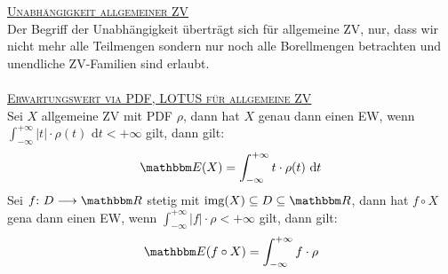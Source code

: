 \textsc{\underline{Unabhängigkeit allgemeiner ZV}}\\
    Der Begriff der Unabhängigkeit überträgt sich für allgemeine ZV, nur, dass wir nicht mehr alle Teilmengen sondern nur noch alle Borellmengen betrachten und unendliche ZV-Familien sind erlaubt. \\ \\
\textsc{\underline{Erwartungswert via PDF, LOTUS für allgemeine ZV}}\\
    Sei \(X\) allgemeine ZV mit PDF \(\rho\), dann hat \(X\) genau dann einen EW, wenn \(\int_{-\infty}^{+\infty}|t| {\cdot} \rho(t) \text{ d}t < +\infty\) gilt, dann gilt:
    \[\Ew(X) = \int_{-\infty}^{+\infty}t \cdot \rho(t)\text{ d}t\]
    Sei \(f\QDp D \longrightarrow \R\) stetig mit \(\img(X) \subseteq D \subseteq \R\), dann hat \(f \circ X\) gena dann einen EW, wenn \(\int_{-\infty}^{+\infty}|f| {\cdot} \rho < +\infty\) gilt, dann gilt:
    \[\Ew(f \circ X) = \int_{-\infty}^{+\infty}f \cdot \rho\]
